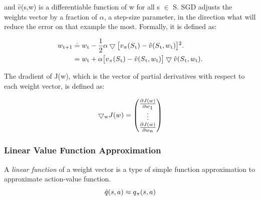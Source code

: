 \documentclass[12pt,twoside]{report}
\theoremstyle{plain}
\theoremstyle{definition}
\begin{document}
and $\hat{v}$(s,w) is a differentiable function of w for all s $\in$ S.
SGD adjusts the weights vector by a fraction of $\alpha$, a step-size parameter,  in the direction what will reduce the error on that example the most. Formally, it is defined as:

\begin{equation}\label{eq:sgd}
\begin{split}
w\textsubscript{t+1} & \doteq w\textsubscript{t} -  \frac{1}{2} \alpha  \bigtriangledown \big[ v\textsubscript{$\pi$}(S\textsubscript{t}) - \hat{v}(S\textsubscript{t}, w\textsubscript{t}) \big]\textsuperscript{2}. \\
& = w\textsubscript{t} +  \alpha  \big[ v\textsubscript{$\pi$}(S\textsubscript{t}) - \hat{v}(S\textsubscript{t}, w\textsubscript{t}) \big] \bigtriangledown \hat{v}(S\textsubscript{t}, w\textsubscript{t}).
\end{split}
\end{equation}


The dradient of J(w), which is the vector of partial derivatives with respect to each weight vector,  is defined as:

\begin{equation}
\bigtriangledown\textsubscript{w} J(w) =  \begin{pmatrix} \frac{\partial J(w)}{\partial w\textsubscript{1}}  \\ \vdots \\ \frac{\partial J(w)}{\partial w\textsubscript{n}}   \end{pmatrix}
\end{equation}


\subsubsection{Linear Value Function Approximation}
A \textit{linear function} of a weight vector is a type of simple function approximation to approximate action-value function. 
\begin{equation}
\hat{q}(s,a) \approx q\textsubscript{$\pi$} (s,a)
\end{equation}
\end{document}
